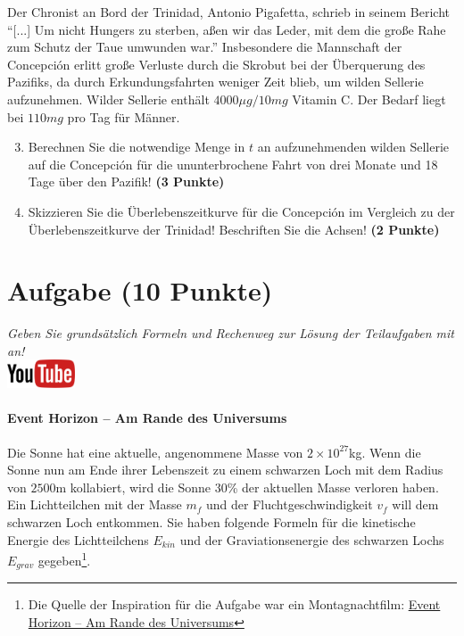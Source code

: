 \documentclass[a4paper, 9pt]{scrartcl}\usepackage[]{graphicx}\usepackage[]{xcolor}
\begin{document}
Der Chronist an Bord der Trinidad, Antonio Pigafetta, schrieb in seinem
Bericht "`[...] Um nicht Hungers zu sterben, a{\ss}en wir das Leder, mit dem
die gro{\ss}e Rahe zum Schutz der Taue umwunden war."' Insbesondere die
Mannschaft der Concepci{\'o}n erlitt gro{\ss}e Verluste durch die Skrobut bei der
{\"U}berquerung des Pazifiks, da durch Erkundungsfahrten weniger Zeit blieb, um
wilden Sellerie aufzunehmen. Wilder Sellerie enth{\"a}lt
$4000\mu g/10mg$ Vitamin C. Der Bedarf liegt bei
$110mg$ pro Tag f{\"u}r M{\"a}nner.

\begin{enumerate}
  \setcounter{enumi}{2}
\item Berechnen Sie die notwendige Menge in $t$ an
  aufzunehmenden wilden Sellerie auf die Concepci{\'o}n f{\"u}r die ununterbrochene
  Fahrt von drei Monate und 18 Tage {\"u}ber den Pazifik!
  \textbf{(3 Punkte)}
\item Skizzieren Sie die {\"U}berlebenszeitkurve f{\"u}r die Concepci{\'o}n im
  Vergleich zu der {\"U}berlebenszeitkurve der Trinidad! Beschriften Sie die
  Achsen! \textbf{(2 Punkte)}
\end{enumerate}

 
\clearpage

\section{Aufgabe \hfill (10 Punkte)}

\textit{Geben Sie grunds{\"a}tzlich Formeln und Rechenweg zur L{\"o}sung der
  Teilaufgaben mit an!} \\[1Ex]

\hfill\href{https://youtu.be/q-qYK4Chslg}{\includegraphics[width =
  2cm]{img/youtube}} %
\hspace{2Ex}

\paragraph{Event Horizon -- Am Rande des Universums}



Die Sonne hat eine aktuelle, angenommene Masse von $\ensuremath{2\times 10^{27}}$kg. Wenn
die Sonne nun am Ende ihrer Lebenszeit zu einem schwarzen Loch mit dem
Radius von $2500$m kollabiert, wird die Sonne $30$\%
der aktuellen Masse verloren haben. Ein Lichtteilchen mit der Masse $m_f$
und der Fluchtgeschwindigkeit $v_f$ will dem schwarzen Loch entkommen.  Sie
haben folgende Formeln f{\"u}r die kinetische Energie des Lichtteilchens
$E_{kin}$ und der Graviationsenergie des schwarzen Lochs $E_{grav}$
gegeben\footnote{Die Quelle der Inspiration
  für die Aufgabe war ein Montagnachtfilm:
  \href{https://de.wikipedia.org/wiki/Event_Horizon_–_Am_Rande_des_Universums}{Event Horizon – Am Rande des Universums}}.
\end{document}
